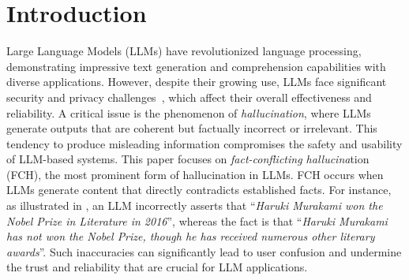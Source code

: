 \section{Introduction}
Large Language Models (LLMs) have revolutionized language processing, demonstrating impressive text generation and comprehension capabilities with diverse applications. However, despite their growing use, LLMs face significant security and privacy challenges~\cite{siddiq2023generate, hou2023large, kaddour2023challenges, li2024model, 10.1145/3691620.3695510}, which affect their overall effectiveness and reliability. A critical issue is the phenomenon of \emph{hallucination}, where LLMs generate outputs that are coherent but factually incorrect or irrelevant. This tendency to produce misleading information compromises the safety and usability of LLM-based systems. This paper focuses on \emph{fact-conflicting hallucina}tion (FCH), the most prominent form of hallucination in LLMs. FCH occurs when LLMs generate content that directly contradicts established facts. For instance, as illustrated in , an LLM incorrectly asserts that ``\emph{Haruki Murakami won the Nobel Prize in Literature in 2016}'', whereas the fact is that ``\emph{Haruki Murakami has not won the Nobel Prize, though he has received numerous other literary awards}''. 
Such inaccuracies can significantly lead to user confusion and undermine the trust and reliability that are crucial for LLM applications.

